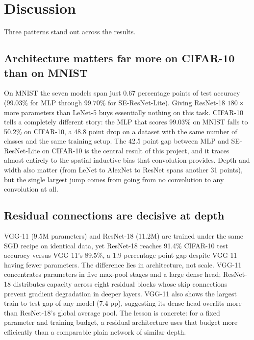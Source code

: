 \documentclass[conference,10pt]{IEEEtran}
\begin{document}
\section{Discussion}
\label{sec:discussion}

Three patterns stand out across the results.

\subsection{Architecture matters far more on CIFAR-10 than on MNIST}

On MNIST the seven models span just 0.67 percentage points of test
accuracy (99.03\% for MLP through 99.70\% for SE-ResNet-Lite). Giving
ResNet-18 $180\times$ more parameters than LeNet-5 buys essentially
nothing on this task. CIFAR-10 tells a completely different story:
the MLP that scores 99.03\% on MNIST falls to 50.2\% on CIFAR-10, a
48.8 point drop on a dataset with the same number of classes and the
same training setup. The 42.5 point gap between MLP and SE-ResNet-Lite
on CIFAR-10 is the central result of this project, and it traces
almost entirely to the spatial inductive bias that convolution
provides. Depth and width also matter (from LeNet to AlexNet to
ResNet spans another 31 points), but the single largest jump comes
from going from no convolution to any convolution at all.

\subsection{Residual connections are decisive at depth}

VGG-11 (9.5M parameters) and ResNet-18 (11.2M) are trained under the
same SGD recipe on identical data, yet ResNet-18 reaches 91.4\%
CIFAR-10 test accuracy versus VGG-11's 89.5\%, a 1.9 percentage-point
gap despite VGG-11 having fewer parameters. The difference lies in
architecture, not scale. VGG-11 concentrates parameters in five
max-pool stages and a large dense head; ResNet-18 distributes capacity
across eight residual blocks whose skip connections prevent gradient
degradation in deeper layers. VGG-11 also shows the largest
train-to-test gap of any model (7.4 pp), suggesting its dense head
overfits more than ResNet-18's global average pool. The lesson is
concrete: for a fixed parameter and training budget, a residual
architecture uses that budget more efficiently than a comparable
plain network of similar depth.
\end{document}
